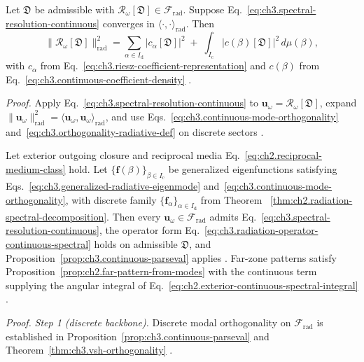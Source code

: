 \begin{proposition}
\label{prop:ch3.continuous-parseval}
Let \(\mathfrak{D}\) be admissible with \(\mathcal{R}_\omega[\mathfrak{D}]\in\mathcal{F}_{\mathrm{rad}}\).
Suppose Eq.~\eqref{eq:ch3.spectral-resolution-continuous} converges in
\(\langle\cdot,\cdot\rangle_{\mathrm{rad}}\). Then
\begin{equation}
\label{eq:ch3.continuous-parseval-identity}
\|\mathcal{R}_\omega[\mathfrak{D}]\|_{\mathrm{rad}}^{2}
=
\sum_{\alpha\in I_{\mathrm{d}}}
\big|c_\alpha[\mathfrak{D}]\big|^{2}
\;+\;
\int_{I_{\mathrm{c}}}
\big|c(\beta)[\mathfrak{D}]\big|^{2}\,d\mu(\beta),
\end{equation}
with \(c_\alpha\) from Eq.~\eqref{eq:ch3.riesz-coefficient-representation} and
\(c(\beta)\) from Eq.~\eqref{eq:ch3.continuous-coefficient-density}
\cite{stratton1941}.
\end{proposition}
\noindent\textit{Proof.}
Apply Eq.~\eqref{eq:ch3.spectral-resolution-continuous} to
\(\mathbf{u}_\omega=\mathcal{R}_\omega[\mathfrak{D}]\), expand
\(\|\mathbf{u}_\omega\|_{\mathrm{rad}}^{2}=\langle\mathbf{u}_\omega,\mathbf{u}_\omega\rangle_{\mathrm{rad}}\),
and use Eqs.~\eqref{eq:ch3.continuous-mode-orthogonality} and~\eqref{eq:ch3.orthogonality-radiative-def}
on discrete sectors \cite{stratton1941}.
\begin{theorem}
\label{thm:ch3.continuous-spectral-decomposition}
Let exterior outgoing closure and reciprocal media
Eq.~\eqref{eq:ch2.reciprocal-medium-class} hold. Let
\(\{\mathbf{f}(\beta)\}_{\beta\in I_{\mathrm{c}}}\) be generalized eigenfunctions satisfying
Eqs.~\eqref{eq:ch3.generalized-radiative-eigenmode} and~\eqref{eq:ch3.continuous-mode-orthogonality},
with discrete family \(\{\mathbf{f}_\alpha\}_{\alpha\in I_{\mathrm{d}}}\) from Theorem
~\ref{thm:ch2.radiation-spectral-decomposition}. Then every
\(\mathbf{u}_\omega\in\mathcal{F}_{\mathrm{rad}}\) admits
Eq.~\eqref{eq:ch3.spectral-resolution-continuous}, the operator form
Eq.~\eqref{eq:ch3.radiation-operator-continuous-spectral} holds on admissible \(\mathfrak{D}\), and
Proposition~\ref{prop:ch3.continuous-parseval} applies \cite{stratton1941}.
Far-zone patterns satisfy Proposition~\ref{prop:ch2.far-pattern-from-modes} with the continuous term
supplying the angular integral of Eq.~\eqref{eq:ch2.exterior-continuous-spectral-integral}
\cite{stratton1941}.
\end{theorem}
\noindent\textit{Proof.}
\emph{Step 1 (discrete backbone).} Discrete modal orthogonality on \(\mathcal{F}_{\mathrm{rad}}\) is established in Proposition~\ref{prop:ch3.continuous-parseval} and Theorem~\ref{thm:ch3.vsh-orthogonality} .
